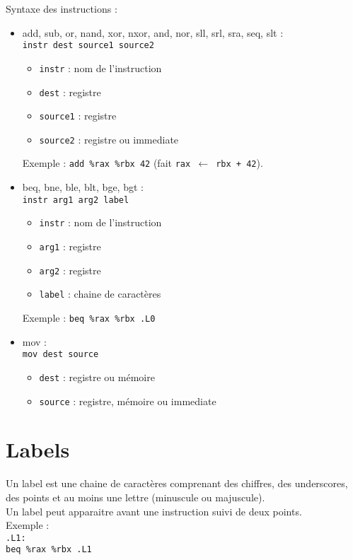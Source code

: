 \documentclass[a4paper]{article}
\begin{document}
    Syntaxe des instructions :
    \begin{itemize}
        \item add, sub, or, nand, xor, nxor, and, nor, sll, srl, sra, seq, slt :\\
        \texttt{instr dest source1 source2}
        \begin{itemize}
            \item \texttt{instr} : nom de l'instruction
            \item \texttt{dest} : registre
            \item \texttt{source1} : registre
            \item \texttt{source2} : registre ou immediate
        \end{itemize}
        Exemple : \texttt{add \%rax \%rbx 42} 
        (fait \texttt{rax $\leftarrow$ rbx + 42}).
        \item beq, bne, ble, blt, bge, bgt :\\
        \texttt{instr arg1 arg2 label}
        \begin{itemize}
            \item \texttt{instr} : nom de l'instruction
            \item \texttt{arg1} : registre
            \item \texttt{arg2} : registre
            \item \texttt{label} : chaine de caractères 
        \end{itemize}
        Exemple : \texttt{beq \%rax \%rbx .L0} 
        \item mov :\\
        \texttt{mov dest source}
        \begin{itemize}
            \item \texttt{dest} : registre ou mémoire
            \item \texttt{source} : registre, mémoire ou immediate
        \end{itemize}
    \end{itemize}

    \section{Labels}
    Un label est une chaine de caractères comprenant des chiffres, 
    des underscores, des points et au moins une lettre (minuscule ou majuscule).\\
    Un label peut apparaitre avant une instruction suivi de deux points.\\
    Exemple :\\
    \texttt{.L1:\\beq \%rax \%rbx .L1}
\end{document}
